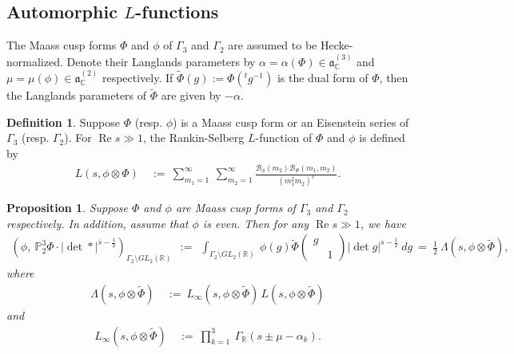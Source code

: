 \documentclass[11pt,reqno]{amsart}
\newtheorem{prop}[thm]{Proposition}
\theoremstyle{definition}
\theoremstyle{definition}
\newtheorem{defi}[thm]{Definition}
\theoremstyle{remark}
\newcommand{\R}{\ensuremath{\mathbb{R}}}
\newcommand{\C}{\ensuremath{\mathbb{C}}}
\numberwithin{equation}{section}
\DeclareMathOperator{\re}{Re}
\begin{document}
\subsection{Automorphic $L$-functions}\label{autoLfunc}
The Maass cusp forms $\Phi$ and  $\phi$  of  $\Gamma_{3}$ and $\Gamma_{2}$  are assumed to be Hecke-normalized.  Denote their Langlands parameters  by    $\alpha=\alpha(\Phi)\in \mathfrak{a}_{\C}^{(3)}$ and $\mu=\mu(\phi) \in \mathfrak{a}_{\C}^{(2)}$  respectively.   If $\widetilde{\Phi}(g):= \Phi\left( ^{t}g^{-1}\right)$ is the dual form of $\Phi$, then the Langlands parameters of $\widetilde{\Phi}$ are given by $-\alpha$. 


	\begin{defi}\label{DScuspRS}
		Suppose $\Phi$  (resp. $\phi$) is a  Maass cusp form or an Eisenstein series of   $\Gamma_{3}$ (resp. $\Gamma_{2}$).  For $\re s \gg 1$, the Rankin-Selberg $L$-function of $\Phi$ and $\phi$ is defined by
	\begin{align}\label{rankse}
		L\left(s, \phi\otimes \Phi\right) \ &:= \    \sum_{m_{1}=1}^{\infty} \ \sum_{m_{2}= 1}^{\infty}  \frac{\mathcal{B}_{\phi}(m_{2})  \mathcal{B}_{\Phi}(m_{1}, m_{2} )}{ \left(m_{1}^2 m_{2}\right)^{s}}. 
	\end{align}
\end{defi}


	
		\begin{prop}\label{ranselmainthm}
		Suppose $\Phi$ and $\phi$ are  Maass cusp forms  of   $\Gamma_{3}$ and  $\Gamma_{2}$  respectively.  In addition, assume that $\phi$ is  even.  Then for	any $\re s\gg 1$, we have
		\begin{align}\label{sameparun}
		\left(\phi,\  \mathbb{P}_{2}^{3}\Phi\cdot |\det *|^{\overline{s}-\frac{1}{2}}\right) _{\Gamma_{2}\setminus GL_{2}(\R)} \ \ := \  \  \int_{\Gamma_{2}\setminus GL_{2}(\R)}  \ \phi(g) \widetilde{\Phi}\begin{pmatrix}
				g & \\
				& 1
			\end{pmatrix} |\det g|^{s-\frac{1}{2}} \ dg  \ = \ 	\frac{1}{2} \  \Lambda(s, \phi\otimes \widetilde{\Phi}),
		\end{align}
	where
		\begin{align}
			\Lambda(s, \phi\otimes \widetilde{\Phi}) \ &:= \ L_{\infty}(s, \phi\otimes \widetilde{\Phi})\, L(s, \phi\otimes \widetilde{\Phi})
		\end{align}
	and 
		\begin{align}
				L_{\infty}(s, \phi\otimes \widetilde{\Phi}) \ &:= \  \prod_{k=1}^{3} \ \Gamma_{\R}\left(s\pm  \mu- \alpha_{k}\right). 
		\end{align}
	
		
	\end{prop}
	
\end{document}
